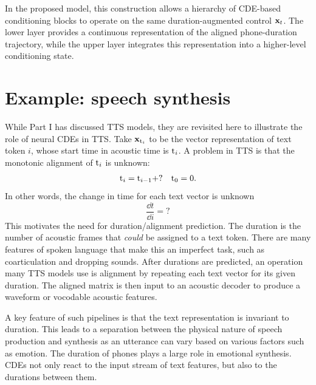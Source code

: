 
In the proposed model, this construction allows a hierarchy of CDE-based conditioning blocks to operate on the same duration-augmented control ${\mathbf{x}}_t$. The lower layer provides a continuous representation of the aligned phone-duration trajectory, while the upper layer integrates this representation into a higher-level conditioning state.

\section{Example: speech synthesis}

While Part I has discussed \ac{TTS} models, they are revisited here to illustrate the role of neural \acp{CDE} in \ac{TTS}. Take ${\mathbf{x}}_{{\textnormal{t}}_i}$ to be the vector representation of text token $i$, whose start time in acoustic time is ${\textnormal{t}}_i$. A problem in \ac{TTS} is that the monotonic alignment of ${\textnormal{t}}_i$ is unknown:
\[
{\textnormal{t}}_i={\textnormal{t}}_{i-1}+? \quad {\textnormal{t}}_0=0.
\]
In other words, the change in time for each text vector is unknown
\[
\frac{\dd t}{\dd i}=?
\]
This motivates the need for duration/alignment prediction. The duration is the number of acoustic frames that \textit{could} be assigned to a text token. There are many features of spoken language that make this an imperfect task, such as coarticulation and dropping sounds. After durations are predicted, an operation many \ac{TTS} models use is alignment by repeating each text vector for its given duration. The aligned matrix is then input to an acoustic decoder to produce a waveform or vocodable acoustic features.

A key feature of such pipelines is that the text representation is invariant to duration. This leads to a separation between the physical nature of speech production and synthesis as an utterance can vary based on various factors such as emotion. The duration of phones plays a large role in emotional synthesis. \acp{CDE} not only react to the input stream of text features, but also to the durations between them.



